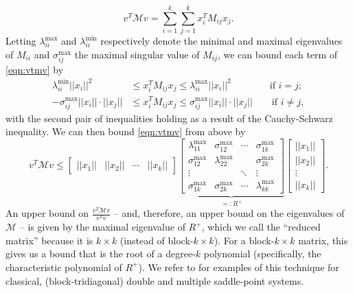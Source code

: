 \documentclass{article}
\begin{document}
\begin{equation}
	\label{eqn:vtmv}
	v^T \mathcal{M} v = \sum_{i=1}^{k} \sum_{j=1}^{k} x_i^T M_{ij}x_j.
\end{equation}
Letting $\lambda_{ii}^{\max}$ and $\lambda_{ii}^{\min}$ respectively denote the minimal and maximal eigenvalues of $M_{ii}$ and $\sigma_{ij}^{\max}$ the maximal singular value of $M_{ij}$, we can bound each term of \eqref{eqn:vtmv} by
\begin{align*}
	\lambda_{ii}^{\min} ||x_i||^2 &\le x_i^T M_{ij}x_j \le \lambda_{ii}^{\max} ||x_i||^2 \qquad \qquad \textrm{if } i=j; \\
    -\sigma_{ij}^{\max} ||x_i||\cdot ||x_j|| &\le x_i^T M_{ij}x_j \le \sigma_{ij}^{\max} ||x_i||\cdot ||x_j|| \qquad \textrm{if } i\ne j,
\end{align*}
with the second pair of inequalities holding as a result of the Cauchy-Schwarz inequality. We can then bound \eqref{eqn:vtmv} from above by
\begin{equation*}
	v^T \mathcal{M} v \le \begin{bmatrix} ||x_1|| & ||x_2|| & \cdots & ||x_k|| \end{bmatrix} \underbrace{\begin{bmatrix}
			\lambda_{11}^{\max}& \sigma_{12}^{\max} &  \cdots & \sigma_{1k}^{\max} \\
			\sigma_{12}^{\max} & \lambda_{22}^{\max} & & \sigma_{2k}^{\max}\\
			\vdots & & \ddots &  \vdots \\
			\sigma_{1k}^{\max} & \sigma_{2k}^{\max} & \cdots  & \lambda_{kk}^{\max}
	\end{bmatrix}}_{=: R^+} \begin{bmatrix}
		||x_1|| \\
		||x_2|| \\
		\vdots \\
		||x_k||
	\end{bmatrix}.
\end{equation*}
An upper bound on $\frac{v^T \mathcal{M} v}{v^T v}$ -- and, therefore, an upper bound on the eigenvalues of $\mathcal{M}$ -- is given by the maximal eigenvalue of $R^+$, which we call the ``reduced matrix'' because it is $k \times k$ (instead of block-$k \times k$). For a block-$k \times k$ matrix, this gives us a bound that is the root of a degree-$k$ polynomial (specifically, the characteristic polynomial of $R^+$). We refer to \cite{BradleyThesis2022,bg22,sz18} for examples of this technique for classical, (block-tridiagonal) double and multiple saddle-point systems.
\end{document}
